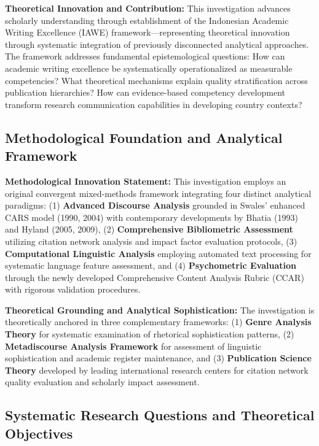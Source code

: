 \documentclass[journal,article,submit,pdftex,moreauthors]{Definitions/mdpi}
\begin{document}
\textbf{Theoretical Innovation and Contribution:} This investigation advances scholarly understanding through establishment of the Indonesian Academic Writing Excellence (IAWE) framework—representing theoretical innovation through systematic integration of previously disconnected analytical approaches. The framework addresses fundamental epistemological questions: How can academic writing excellence be systematically operationalized as measurable competencies? What theoretical mechanisms explain quality stratification across publication hierarchies? How can evidence-based competency development transform research communication capabilities in developing country contexts?

\subsection{Methodological Foundation and Analytical Framework}

\textbf{Methodological Innovation Statement:} This investigation employs an original convergent mixed-methods framework integrating four distinct analytical paradigms: (1) \textbf{Advanced Discourse Analysis} grounded in Swales' enhanced CARS model (1990, 2004) with contemporary developments by Bhatia (1993) and Hyland (2005, 2009), (2) \textbf{Comprehensive Bibliometric Assessment} utilizing citation network analysis and impact factor evaluation protocols, (3) \textbf{Computational Linguistic Analysis} employing automated text processing for systematic language feature assessment, and (4) \textbf{Psychometric Evaluation} through the newly developed Comprehensive Content Analysis Rubric (CCAR) with rigorous validation procedures.

\textbf{Theoretical Grounding and Analytical Sophistication:} The investigation is theoretically anchored in three complementary frameworks: (1) \textbf{Genre Analysis Theory} \citep{bhatia1993,swales2004} for systematic examination of rhetorical sophistication patterns, (2) \textbf{Metadiscourse Analysis Framework} \citep{hyland2005,hyland2009} for assessment of linguistic sophistication and academic register maintenance, and (3) \textbf{Publication Science Theory} developed by leading international research centers for citation network quality evaluation and scholarly impact assessment.

\subsection{Systematic Research Questions and Theoretical Objectives}
\end{document}
